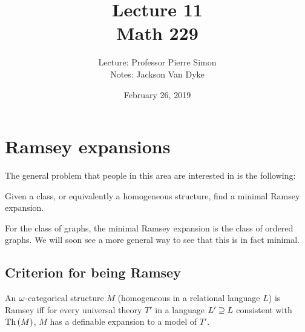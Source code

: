 \documentclass{amsart}
\begin{document}
\title{Lecture 11\\Math 229}
\author{Lecture: Professor Pierre Simon\\Notes: Jackson Van Dyke}
\date{February 26, 2019}
\maketitle

\section{Ramsey expansions}

The general problem that people in this area are interested in is the following:

\begin{qn}
Given a \Fraisse class, or equivalently a homogeneous structure, find a minimal Ramsey
expansion.
\end{qn}

\begin{exm}
For the class of graphs, the minimal Ramsey expansion is the class of ordered graphs.
We will soon see a more general way to see that this is in fact minimal.
\end{exm}

\subsection{Criterion for being Ramsey}

\begin{prop}
An $\omega$-categorical structure $M$ (homogeneous in a relational language $L$)
is Ramsey iff for every universal theory $T'$
in a language $L'\supseteq L$ consistent with $\operatorname{Th}\left( M \right)$, $M$ has a definable
expansion to a model of $T'$.
\end{prop}
\end{document}
